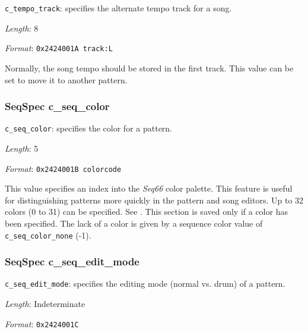    \begin{description}
      \item \texttt{c\_tempo\_track}:
         specifies the alternate tempo track for a song.
      \item \textsl{Length}: 8
      \item \textsl{Format}: \texttt{0x2424001A track:L}
   \end{description}

   Normally, the song tempo should be stored in the first track.
   This value can be set to move it to another pattern.

\subsubsection{SeqSpec c\_seq\_color}
\label{subsubsec:midi_format_track_seqspec_seq_color}

   \begin{description}
      \item \texttt{c\_seq\_color}: specifies the color for a pattern.
      \item \textsl{Length}: 5
      \item \textsl{Format}: \texttt{0x2424001B colorcode}
   \end{description}

   This value specifies an index into the \textsl{Seq66} color palette.
   This feature is useful for distinguishing patterns more quickly in the
   pattern and song editors. Up to 32 colors (0 to 31) can be specified.
   See .
   This section is saved only if a color has been specified.
   The lack of a color is given by a sequence color value of
   \texttt{c\_seq\_color\_none} (-1).

\subsubsection{SeqSpec c\_seq\_edit\_mode}
\label{subsubsec:midi_format_track_seqspec_seq_edit_mode}

   \begin{description}
      \item \texttt{c\_seq\_edit\_mode}:
         specifies the editing mode (normal vs. drum) of a pattern.
      \item \textsl{Length}: Indeterminate
      \item \textsl{Format}: \texttt{0x2424001C}
   \end{description}

